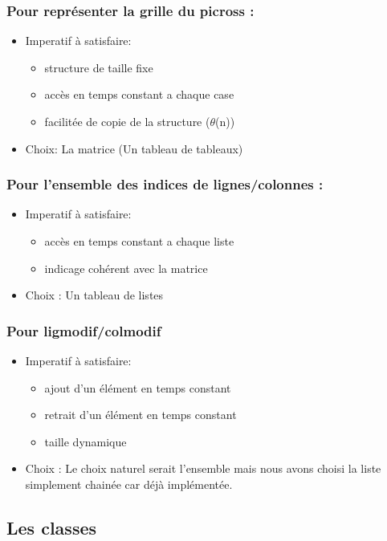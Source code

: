 \documentclass{article}
\begin{document}
\subsubsection{Pour représenter la grille du picross :}
\begin{itemize}
\item Imperatif à satisfaire:
\begin{itemize}
\item structure de taille fixe
\item accès en temps constant a chaque case
\item facilitée de copie de la structure ($\theta$(n))
\end{itemize}
\item Choix: La matrice (Un tableau de tableaux)
\end{itemize}
\subsubsection{Pour l'ensemble des indices de lignes/colonnes :}
\begin{itemize}
\item Imperatif à satisfaire:
\begin{itemize}
\item accès en temps constant a chaque liste
\item indicage cohérent avec la matrice
\end{itemize}
\item Choix : Un tableau de listes
\end{itemize}
\subsubsection{Pour ligmodif/colmodif}
\begin{itemize}
\item Imperatif à satisfaire:
\begin{itemize}
\item ajout d'un élément en temps constant
\item retrait d'un élément en temps constant
\item taille dynamique
\end{itemize}
\item Choix :
Le choix naturel serait l'ensemble mais nous avons choisi la liste simplement chainée car déjà implémentée.
\end{itemize}
\newpage
\subsection{Les classes}
\end{document}
